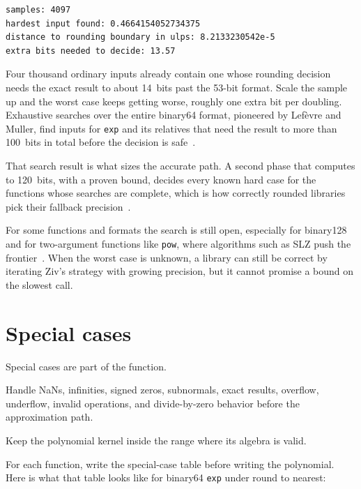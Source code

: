 \documentclass[manuscript, nonacm]{acmart}
\begin{document}
  \begin{lstlisting}[style=output]
samples: 4097
hardest input found: 0.4664154052734375
distance to rounding boundary in ulps: 8.2133230542e-5
extra bits needed to decide: 13.57
  \end{lstlisting}

  Four thousand ordinary inputs already contain one whose rounding decision
  needs the exact result to about 14~bits past the 53-bit format. Scale
  the sample up and the worst case keeps getting worse, roughly one extra
  bit per doubling. Exhaustive searches over the entire binary64 format,
  pioneered by Lef\`evre and Muller, find inputs for \texttt{exp} and its
  relatives that need the result to more than 100~bits in total before the
  decision is safe~\cite{lefevre}.

  That search result is what sizes the accurate path. A second phase
  that computes to 120~bits, with a proven bound, decides every known hard
  case for the functions whose searches are complete, which is how
  correctly rounded libraries pick their fallback
  precision~\cite{crlibm,muller}.

  For some functions and formats the search is still open, especially for
  binary128 and for two-argument functions like \texttt{pow}, where
  algorithms such as SLZ push the frontier~\cite{muller,handbook}. When
  the worst case is unknown, a library can still be correct by iterating
  Ziv's strategy with growing precision, but it cannot promise a bound on
  the slowest call.



  \section{Special cases}

  Special cases are part of the function.

  Handle NaNs, infinities, signed zeros, subnormals, exact results, overflow,
  underflow, invalid operations, and divide-by-zero behavior before the
  approximation path.

  Keep the polynomial kernel inside the range where its algebra is valid.

  For each function, write the special-case table before writing the
  polynomial. Here is what that table looks like for binary64 \texttt{exp}
  under round to nearest:
\end{document}
